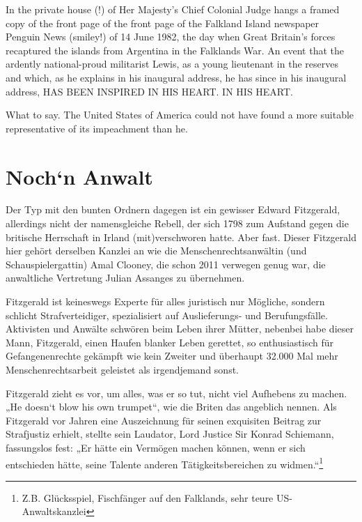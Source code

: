 \begin{multicols}{2}
In the private house (!) of Her Majesty's Chief Colonial Judge hangs a framed copy of the front page of the
front page of the Falkland Island newspaper Penguin News (smiley!) of
14 June 1982, the day when Great Britain's forces recaptured the islands from Argentina in the Falklands War. An event that the ardently national-proud militarist Lewis, as a young lieutenant in the reserves
and which, as he explains in his inaugural address, he has since
in his inaugural address, HAS BEEN INSPIRED IN HIS HEART.
IN HIS HEART.

What to say. The United States of America could not have found a more suitable representative of its impeachment
than he.


\chapter{Noch‘n Anwalt} %

Der Typ mit den bunten Ordnern dagegen ist ein gewisser Edward Fitzgerald, allerdings nicht der namensgleiche Rebell, der sich 1798 zum Aufstand gegen die britische Herrschaft in Irland (mit)verschworen hatte. Aber
fast. Dieser Fitzgerald hier gehört derselben Kanzlei an
wie die Menschenrechtsanwältin (und Schauspielergattin) Amal Clooney, die schon 2011 verwegen genug war,
die anwaltliche Vertretung Julian Assanges zu übernehmen.

Fitzgerald ist keineswegs Experte für alles juristisch nur
Mögliche, sondern schlicht Strafverteidiger, spezialisiert
auf Auslieferungs- und Berufungsfälle. Aktivisten und
Anwälte schwören beim Leben ihrer Mütter, nebenbei
habe dieser Mann, Fitzgerald, einen Haufen blanker Leben gerettet, so enthusiastisch für Gefangenenrechte gekämpft wie kein Zweiter und überhaupt 32.000 Mal mehr
Menschenrechtsarbeit geleistet als irgendjemand sonst.

Fitzgerald zieht es vor, um alles, was er so tut, nicht viel
Aufhebens zu machen. „He doesn‘t blow his own trumpet“, wie die Briten das angeblich nennen. Als Fitzgerald vor Jahren eine Auszeichnung für seinen exquisiten
Beitrag zur Strafjustiz erhielt, stellte sein Laudator, Lord
Justice Sir Konrad Schiemann, fassungslos fest: „Er hätte
ein Vermögen machen können, wenn er sich entschieden hätte, seine Talente anderen Tätigkeitsbereichen zu
widmen.“\footnote[12]{Z.B. Glücksspiel, Fischfänger auf den Falklands, sehr teure US-Anwaltskanzlei}


\end{multicols}
